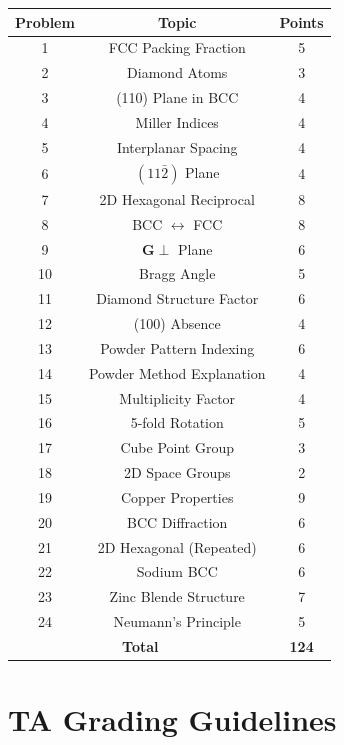 \documentclass[12pt,a4paper]{article}
\begin{document}
\begin{table}[h]
\centering
\begin{tabular}{|c|c|c|}
\hline
\textbf{Problem} & \textbf{Topic} & \textbf{Points} \\
\hline
1 & FCC Packing Fraction & 5 \\
2 & Diamond Atoms & 3 \\
3 & (110) Plane in BCC & 4 \\
4 & Miller Indices & 4 \\
5 & Interplanar Spacing & 4 \\
6 & $(11\bar{2})$ Plane & 4 \\
7 & 2D Hexagonal Reciprocal & 8 \\
8 & BCC $\leftrightarrow$ FCC & 8 \\
9 & $\mathbf{G} \perp$ Plane & 6 \\
10 & Bragg Angle & 5 \\
11 & Diamond Structure Factor & 6 \\
12 & (100) Absence & 4 \\
13 & Powder Pattern Indexing & 6 \\
14 & Powder Method Explanation & 4 \\
15 & Multiplicity Factor & 4 \\
16 & 5-fold Rotation & 5 \\
17 & Cube Point Group & 3 \\
18 & 2D Space Groups & 2 \\
19 & Copper Properties & 9 \\
20 & BCC Diffraction & 6 \\
21 & 2D Hexagonal (Repeated) & 6 \\
22 & Sodium BCC & 6 \\
23 & Zinc Blende Structure & 7 \\
24 & Neumann's Principle & 5 \\
\hline
\multicolumn{2}{|c|}{\textbf{Total}} & \textbf{124} \\
\hline
\end{tabular}
\end{table}

\section{TA Grading Guidelines}
\end{document}

